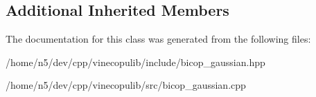 \subsection*{Additional Inherited Members}


The documentation for this class was generated from the following files\+:\begin{DoxyCompactItemize}
\item 
/home/n5/dev/cpp/vinecopulib/include/bicop\+\_\+gaussian.\+hpp\item 
/home/n5/dev/cpp/vinecopulib/src/bicop\+\_\+gaussian.\+cpp\end{DoxyCompactItemize}
